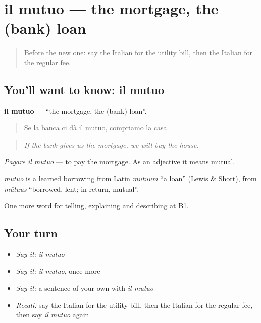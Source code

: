 \section[il mutuo]{il mutuo — the mortgage, the (bank) loan}

\label{lesson:IT-C394-mutuo}



\begin{quote}
Before the new one: say the Italian for the utility bill, then the Italian for the regular fee.
\end{quote}

\subsection*{You'll want to know: il mutuo}
\textbf{il mutuo} — \textquotedblleft{}the mortgage, the (bank) loan\textquotedblright{}.

\begin{quote}
Se la banca ci dà il mutuo, compriamo la casa.
\end{quote}

\begin{quote}
\emph{If the bank gives us the mortgage, we will buy the house.}
\end{quote}

\emph{Pagare il mutuo} — to pay the mortgage. As an adjective it means mutual.

\begin{cousinweb}
\emph{mutuo} is a learned borrowing from Latin \emph{mūtuum} \textquotedblleft{}a loan\textquotedblright{} (Lewis \& Short), from \emph{mūtuus} \textquotedblleft{}borrowed, lent; in return, mutual\textquotedblright{}.
\end{cousinweb}

\begin{grammarlens}[title={What you've built}]
One more word for telling, explaining and describing at B1.
\end{grammarlens}

\subsection*{Your turn}
\begin{itemize}
\raggedright
  \item \emph{Say it:} \emph{il mutuo}
  \item \emph{Say it:} \emph{il mutuo}, once more
  \item \emph{Say it:} a sentence of your own with \emph{il mutuo}
  \item \emph{Recall:} say the Italian for the utility bill, then the Italian for the regular fee, then say \emph{il mutuo} again
\end{itemize}


